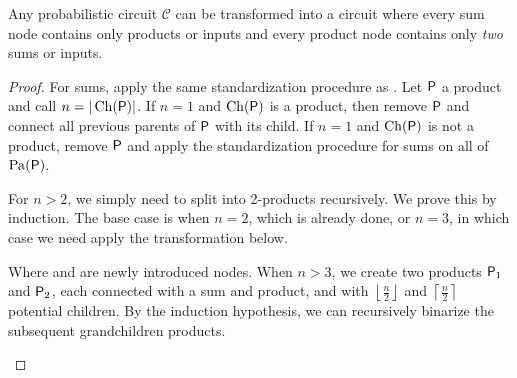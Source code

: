 \begin{theorem}[2-Standardization]
\label{thm:2standard}
Any probabilistic circuit $\mathcal{C}$ can be transformed into a circuit where every sum node
contains only products or inputs and every product node contains only \emph{two} sums or inputs.
\end{theorem}
\begin{proof}
  For sums, apply the same standardization procedure as . Let $\operatorname{\textup{\textsf{P}}}$ a product
  and call $n=|\operatorname*{\normalfont{Ch}}(\operatorname{\textup{\textsf{P}}})|$. If $n=1$ and $\operatorname*{\normalfont{Ch}}(\operatorname{\textup{\textsf{P}}})$ is a product, then remove $\operatorname{\textup{\textsf{P}}}$ and
  connect all previous parents of $\operatorname{\textup{\textsf{P}}}$ with its child. If $n=1$ and $\operatorname*{\normalfont{Ch}}(\operatorname{\textup{\textsf{P}}})$ is not a
  product, remove $\operatorname{\textup{\textsf{P}}}$ and apply the standardization procedure for sums on all of $\operatorname*{\normalfont{Pa}}(\operatorname{\textup{\textsf{P}}})$.

  For $n>2$, we simply need to split into 2-products recursively. We prove this by induction. The
  base case is when $n=2$, which is already done, or $n=3$, in which case we need apply the
  transformation below.
  \begin{center}
  \end{center}
  Where \inode[fill=boxorange!80]{\newSumNode} and \inode[fill=boxgoldenrod!70]{\newProdNode} are
  newly introduced nodes. When $n>3$, we create two products $\operatorname{\textup{\textsf{P}}}_1$ and $\operatorname{\textup{\textsf{P}}}_2$, each
  connected with a sum and product, and with $\left\lfloor\frac{n}{2}\right\rfloor$ and
  $\left\lceil\frac{n}{2}\right\rceil$ potential children. By the induction hypothesis, we can
  recursively binarize the subsequent grandchildren products.
  \begin{center}
\end{center}
\end{proof}
